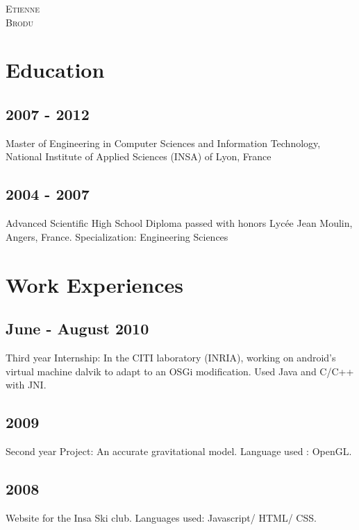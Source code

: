 
\usepackage[english]{babel}


\pagestyle{empty}

	{
		\LARGE{\textsc{Etienne}\\
				\textsc{Brodu}}
	}
	
	
	
\section{Education}
	\subsection{2007 - 2012}
		{Master of Engineering in Computer Sciences and Information Technology, National Institute of Applied Sciences (INSA) of Lyon, France}
		
	\subsection{2004 - 2007}
		{Advanced Scientific High School Diploma passed with honors Lyc\'{e}e Jean Moulin, Angers, France. Specialization: Engineering Sciences}

\section{Work Experiences}
	\subsection{June - August 2010}
		{Third year Internship: In the CITI laboratory (INRIA), working on android's virtual machine dalvik to adapt to an OSGi modification. Used Java and C/C++ with JNI.}

	\subsection{2009}
		{Second year Project: An accurate gravitational model. Language used : OpenGL.}
		
	\subsection{2008}
		{Website for the Insa Ski club. Languages used: Javascript/ HTML/ CSS.}
				
